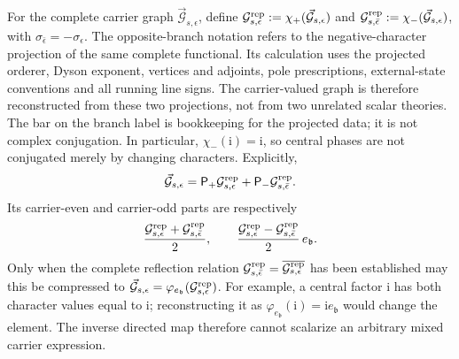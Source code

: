 \documentclass[final,5p,times,twocolumn,numbers,nopreprintline]{elsarticle}
\numberwithin{equation}{section}
\theoremstyle{definition}
\theoremstyle{remark}
\newcommand{\ii}{\mathrm i}
\newcommand{\bb}{\mathfrak b}
\newcommand{\ee}{e_{\bb}}
\newcommand{\embed}{\varphi_{\ee}}
\begin{document}
For the complete carrier graph \(\vec{\mathcal G}_{s,\epsilon}\), define
\(\mathcal G^{\rm rep}_{s,\epsilon}
:=\chi_+(\vec{\mathcal G}_{s,\epsilon})\) and
\(\mathcal G^{\rm rep}_{s,\bar\epsilon}
:=\chi_-(\vec{\mathcal G}_{s,\epsilon})\), with
\(\sigma_{\bar\epsilon}=-\sigma_\epsilon\).
The opposite-branch notation refers to the negative-character
projection of the same complete functional. Its calculation uses
the projected orderer, Dyson exponent, vertices and adjoints, pole
prescriptions, external-state conventions and all running line signs.
The carrier-valued graph is therefore
reconstructed from these two projections, not from two unrelated
scalar theories. The bar on the branch label is bookkeeping for the
projected data; it is not complex conjugation. In particular,
\(\chi_-(\ii)=\ii\), so central phases are not conjugated merely
by changing characters. Explicitly,
\begin{equation}
 \vec{\mathcal G}_{s,\epsilon}
  =\mathsf P_+\mathcal G^{\rm rep}_{s,\epsilon}
   +\mathsf P_-\mathcal G^{\rm rep}_{s,\bar\epsilon}.
 \label{eq:complete-graph-character-reconstruction}
\end{equation}
Its carrier-even and carrier-odd parts are respectively
\begin{equation}
 \frac{\mathcal G^{\rm rep}_{s,\epsilon}
             +\mathcal G^{\rm rep}_{s,\bar\epsilon}}{2},
 \qquad
 \frac{\mathcal G^{\rm rep}_{s,\epsilon}
             -\mathcal G^{\rm rep}_{s,\bar\epsilon}}{2}\,\ee.
 \label{eq:complete-graph-parity}
\end{equation}
Only when the complete reflection relation
\(\mathcal G^{\rm rep}_{s,\bar\epsilon}
=\overline{\mathcal G^{\rm rep}_{s,\epsilon}}\) has been
established may this be compressed to
\(\vec{\mathcal G}_{s,\epsilon}
=\embed(\mathcal G^{\rm rep}_{s,\epsilon})\).
For example, a central factor \(\ii\) has both character values
equal to \(\ii\); reconstructing it as
\(\embed(\ii)=\ii\ee\) would change the element.
The inverse directed map therefore cannot scalarize an arbitrary
mixed carrier expression.
\end{document}
